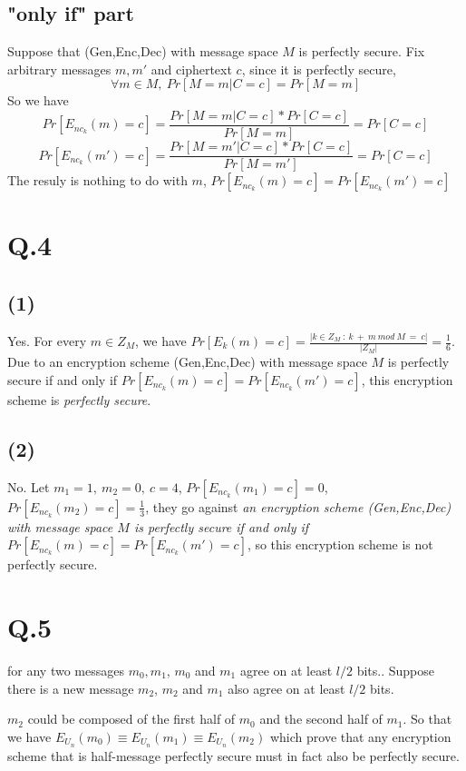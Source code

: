 \documentclass[onecolumn,oneside]{SUSTechHomework}
\begin{document}
  \subsection*{"only if" part}
  Suppose that (Gen,Enc,Dec) with message space $M$ is perfectly secure. Fix arbitrary messages $m, m'$ and ciphertext $c$, since it is perfectly secure,
  $$\forall m \in M,~Pr[M=m|C=c]=Pr[M=m]$$
  So we have
  $$Pr[E_{nc_k}(m)=c]=\frac{Pr[M=m|C=c]*Pr[C=c]}{Pr[M=m]}=Pr[C=c]$$
  $$Pr[E_{nc_k}(m')=c]=\frac{Pr[M=m'|C=c]*Pr[C=c]}{Pr[M=m']}=Pr[C=c]$$
  The resuly is nothing to do with $m$, $Pr[E_{nc_k}(m)=c]=Pr[E_{nc_k}(m')=c]$

  \section*{Q.4}
  
  \subsection*{(1)}
  Yes. For every $m \in Z_M$, we have $Pr[E_k(m)=c]=\frac{|{k \in Z_M~:~k~+~m~mod~M~=~c}|}{|Z_M|} = \frac{1}{6}$. Due to an encryption scheme (Gen,Enc,Dec) with message space $M$ is perfectly secure if and only if $Pr[E_{nc_k}(m)=c]=Pr[E_{nc_k}(m')=c]$, this encryption scheme is \emph{perfectly secure}.

  \subsection*{(2)}
  No. Let $m_1=1,~m_2=0,~c=4$, $Pr[E_{nc_k}(m_1)=c]=0$, $Pr[E_{nc_k}(m_2)=c]=\frac{1}{3}$, they go against \emph{an encryption scheme (Gen,Enc,Dec) with message space $M$ is perfectly secure if and only if $Pr[E_{nc_k}(m)=c]=Pr[E_{nc_k}(m')=c]$}, so this encryption scheme is not perfectly secure.

  \section*{Q.5}
  for any two messages $m_0,m_1$, $m_0$ and $m_1$ agree on at least $l/2$ bits.. Suppose there is a new message $m_2$, $m_2$ and $m_1$ also agree on at least $l/2$ bits.

  $m_2$ could be composed of the first half of $m_0$ and the second half of $m_1$. So that we have $E_{U_n}(m_0) \equiv E_{U_n}(m_1) \equiv E_{U_n}(m_2)$ which prove that any encryption scheme that is half-message perfectly secure must in fact also be perfectly secure.
\end{document}
